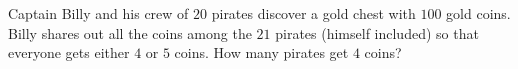 Captain Billy and his crew of $20$ pirates discover a gold chest with $100$ gold coins. Billy shares out all the coins among the $21$ pirates (himself included) so that everyone gets either $4$ or $5$ coins. How many pirates get $4$ coins?
